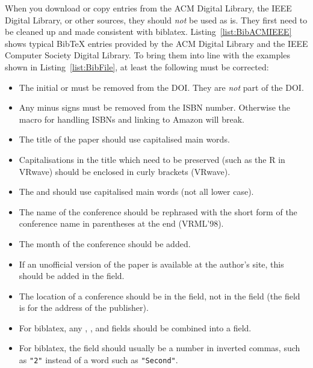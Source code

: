 When you download or copy  entries from the ACM Digital
Library, the IEEE Digital Library, or other sources, they should
\emph{not} be used as is. They first need to be cleaned up and made
consistent with biblatex. Listing~\ref{list:BibACMIEEE} shows typical
BibTeX entries provided by the ACM Digital Library and the IEEE
Computer Society Digital Library. To bring them into line with the
examples shown in Listing~\ref{list:BibFile}, at least the following
must be corrected:
\begin{itemize}
\item The initial  or
   must be removed from
  the DOI. They are \emph{not} part of the DOI.

\item Any minus signs must be removed from the ISBN number.
  Otherwise the macro for handling ISBNs and linking to Amazon will
  break.

\item The title of the paper should use capitalised main words.

\item Capitalisations in the title which need to be preserved (such as
  the R in VRwave) should be enclosed in curly brackets ({VRwave}).

\item The  and  should use
  capitalised main words (not all lower case).

\item The name of the conference should be rephrased with the short
  form of the conference name in parentheses at the end (VRML'98).

\item The month of the conference should be added.

\item If an unofficial version of the paper is available at the
  author's site, this should be added in the  field.

\item The location of a conference should be in the 
  field, not in the  field (the  field
  is for the address of the publisher).

\item For biblatex, any , , and 
  fields should be combined into a  field.

\item For biblatex, the  field should usually be a
  number in inverted commas, such as \verb|"2"| instead of a word
  such as \verb|"Second"|.

\end{itemize}






